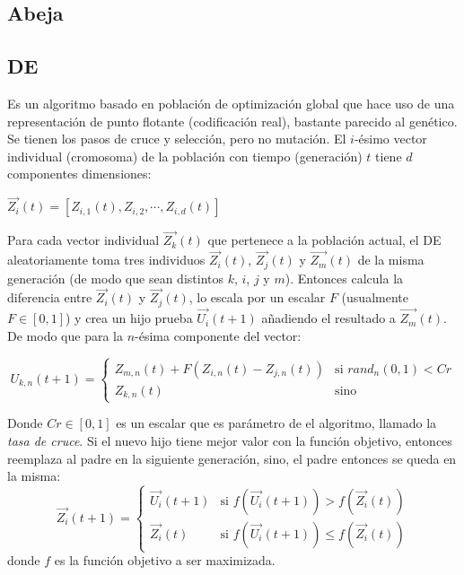 \subsection{Abeja}

\subsection{DE}

Es un algoritmo basado en poblaci\'on de
optimizaci\'on global que hace uso de una representaci\'on de punto flotante
(codificaci\'on real), bastante parecido al gen\'etico. Se tienen los pasos de cruce 
y selecci\'on, pero no mutaci\'on.
El $i$-\'esimo vector individual (cromosoma)
de la poblaci\'on con tiempo (generaci\'on) $t$ tiene $d$ componentes
dimensiones:

\begin{center}
$ \overrightarrow{Z_i}(t) = [ Z_{i,1}(t), Z_{i,2}, \cdots, Z_{i,d}(t) ] $
\end{center}

Para cada vector individual $\overrightarrow{Z_k}(t)$ que pertenece
a la poblaci\'on actual, el DE aleatoriamente toma tres individuos
$\overrightarrow{Z_i}(t)$, $\overrightarrow{Z_j}(t)$ y $\overrightarrow{Z_m}(t)$ de la misma generaci\'on (de modo que sean distintos $k$, 
$i$, $j$ y $m$). Entonces calcula la diferencia entre $\overrightarrow{Z_i}(t)$ y $\overrightarrow{Z_j}(t)$, lo escala por un escalar $F$
(usualmente $F \in [0, 1]$) y crea un hijo prueba $\overrightarrow{U_i}(t + 1)$ a\~nadiendo el resultado a $\overrightarrow{Z_m}(t)$. De modo
que para la $n$-\'esima componente del vector:

\[
  U_{k,n}(t+1) =
  \begin{cases}
    Z_{m,n}(t) + F(Z_{i,n}(t) - Z_{j,n}(t))  & \text{si } rand_n(0,1) < Cr\\
    Z_{k,n}(t)                               & \text{sino}
  \end{cases}
\]

Donde $Cr \in [0, 1]$ es un escalar que es par\'ametro de el algoritmo,
llamado la \emph{tasa de cruce}. Si el nuevo hijo tiene mejor valor
con la funci\'on objetivo, entonces reemplaza al padre en la siguiente
generaci\'on, sino, el padre entonces se queda en la misma:
\[
  \overrightarrow{Z_i}(t+1) =
  \begin{cases}
    \overrightarrow{U_i}(t+1) & \text{si } f(\overrightarrow{U_i}(t+1)) > f(\overrightarrow{Z_i}(t)) \\
    \overrightarrow{Z_i}(t)   & \text{si } f(\overrightarrow{U_i}(t+1)) \leq f(\overrightarrow{Z_i}(t))
  \end{cases}
\]
donde $f$ es la funci\'on objetivo a ser maximizada.

